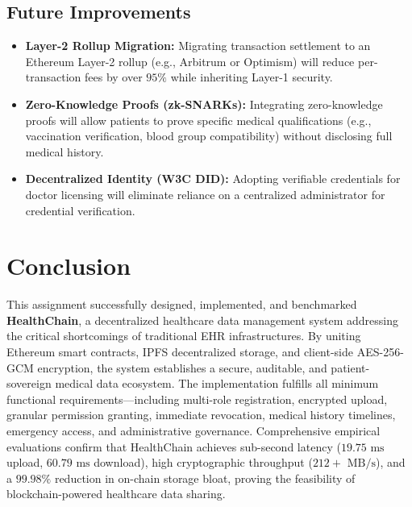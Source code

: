 \documentclass[11pt,a4paper]{article}
\begin{document}
\subsection{Future Improvements}
\begin{itemize}
    \item \textbf{Layer-2 Rollup Migration:} Migrating transaction settlement to an Ethereum Layer-2 rollup (e.g., Arbitrum or Optimism) will reduce per-transaction fees by over $95\%$ while inheriting Layer-1 security.
    \item \textbf{Zero-Knowledge Proofs (zk-SNARKs):} Integrating zero-knowledge proofs will allow patients to prove specific medical qualifications (e.g., vaccination verification, blood group compatibility) without disclosing full medical history.
    \item \textbf{Decentralized Identity (W3C DID):} Adopting verifiable credentials for doctor licensing will eliminate reliance on a centralized administrator for credential verification.
\end{itemize}

\section{Conclusion}
This assignment successfully designed, implemented, and benchmarked \textbf{HealthChain}, a decentralized healthcare data management system addressing the critical shortcomings of traditional EHR infrastructures. By uniting Ethereum smart contracts, IPFS decentralized storage, and client-side AES-256-GCM encryption, the system establishes a secure, auditable, and patient-sovereign medical data ecosystem. The implementation fulfills all minimum functional requirements—including multi-role registration, encrypted upload, granular permission granting, immediate revocation, medical history timelines, emergency access, and administrative governance. Comprehensive empirical evaluations confirm that HealthChain achieves sub-second latency ($19.75\text{ ms}$ upload, $60.79\text{ ms}$ download), high cryptographic throughput ($212+\text{ MB/s}$), and a $99.98\%$ reduction in on-chain storage bloat, proving the feasibility of blockchain-powered healthcare data sharing.
\end{document}
